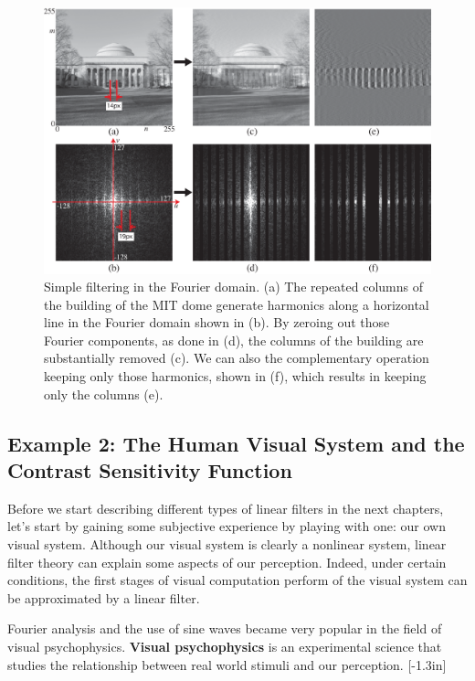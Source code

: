 \begin{figure}[t]
\centerline{
\includegraphics[width=1\linewidth]{figures/Image_processing_fourier/mit_columns.eps}}
\caption{Simple filtering in the Fourier domain.  (a) The repeated columns of the
  building of the MIT dome generate harmonics along a horizontal line
  in the Fourier domain shown in (b). By zeroing out those Fourier
  components, as done in (d), the columns of the building are substantially removed (c). We can also the complementary operation keeping only those harmonics, shown in (f), which results in keeping only the columns (e).
} 
\label{fig:filteringFT}
\end{figure}


\subsection{Example 2: The Human Visual System and the Contrast Sensitivity Function}

Before we start describing different types of linear filters in the next chapters, let's start by gaining some subjective experience by playing with one: our own visual system. Although our visual system is clearly a nonlinear system, linear filter theory can explain some aspects of our perception. Indeed, under certain conditions, the first stages of visual computation perform of the visual system can be approximated by a linear filter. 

Fourier analysis and the use of sine waves became very popular in the field of visual psychophysics. {\bf Visual psychophysics}
is an experimental science that studies the relationship between real world stimuli and our perception.
[-1.3in]


